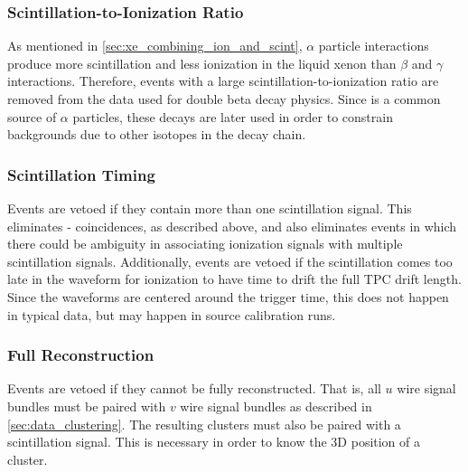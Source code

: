 \documentclass[herrin-thesis.tex]{subfiles}
\begin{document}
\subsubsection{Scintillation-to-Ionization Ratio}
As mentioned in \cref{sec:xe_combining_ion_and_scint}, \(\alpha\) particle interactions produce more scintillation and less ionization in the liquid xenon than \(\beta\) and \(\gamma\) interactions. Therefore, events with a large scintillation-to-ionization ratio are removed from the data used for double beta decay physics. Since  is a common source of \(\alpha\) particles, these decays are later used in order to constrain backgrounds due to other isotopes in the  decay chain.

\subsubsection{Scintillation Timing}
Events are vetoed if they contain more than one scintillation signal. This eliminates - coincidences, as described above, and also eliminates events in which there could be ambiguity in associating ionization signals with multiple scintillation signals. Additionally, events are vetoed if the scintillation comes too late in the waveform for ionization to have time to drift the full TPC drift length. Since the waveforms are centered around the trigger time, this does not happen in typical data, but may happen in source calibration runs.

\subsubsection{Full Reconstruction}
Events are vetoed if they cannot be fully reconstructed. That is, all \(u\) wire signal bundles must be paired with \(v\) wire signal bundles as described in \cref{sec:data_clustering}. The resulting clusters must also be paired with a scintillation signal. This is necessary in order to know the 3D position of a cluster.
\end{document}
